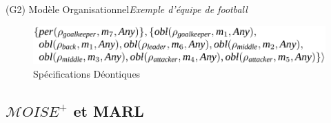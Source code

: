 \begin{frame}{(G2) Modèle Organisationnel}{\textit{Exemple d'équipe de football}}
    \ \\

    \begin{minipage}{\textwidth}
        \centering
        \begin{figure}[H]
            \centering
            \includegraphics[width=0.4\linewidth]{figures/soccer_ds.png}
            \caption*{Spécifications Déontiques}
        \end{figure}
    \end{minipage}

\end{frame}


\subsection{$\mathcal{M}OISE^+$ et MARL}

